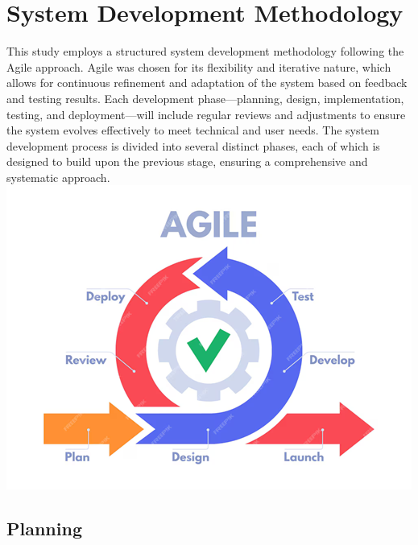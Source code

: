 \section{System Development Methodology}

This study employs a structured system development methodology following the Agile approach. Agile was chosen for its flexibility and iterative nature, which allows for continuous refinement and adaptation of the system based on feedback and testing results. Each development phase—planning, design, implementation, testing, and deployment—will include regular reviews and adjustments to ensure the system evolves effectively to meet technical and user needs.
The system development process is divided into several distinct phases, each of which is designed to build upon the previous stage, ensuring a comprehensive and systematic approach.
\includegraphics{AGILE}

\subsection{Planning}


